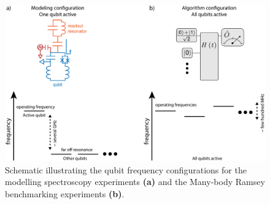 \begin{figure}[h]
    \begin{center}
        \includegraphics[width=150 mm]{./PDF/bias_configurations.pdf}
    \end{center}
    \caption{
    Schematic illustrating the qubit frequency configurations for the modelling spectroscopy experiments \textbf{(a)} and the Many-body Ramsey benchmarking experiments \textbf{(b)}.
    }
    \label{bias_configurations}
\end{figure}

